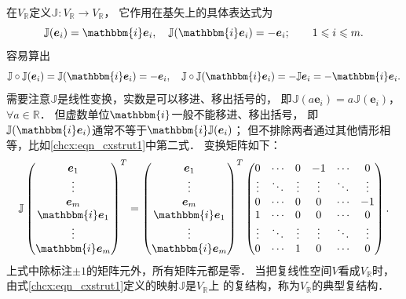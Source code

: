 在$V_{\mathbb{R}}$定义$\mathbb{J}:V_{\mathbb{R}}\to V_{\mathbb{R}}$，
它作用在基矢上的具体表达式为
\begin{equation}\label{chcx:eqn_cxstrut1}
    \mathbb{J} (\boldsymbol{e}_i) = \mathbbm{i} \boldsymbol{e}_i, \quad
    \mathbb{J} (\mathbbm{i}\boldsymbol{e}_i) = - \boldsymbol{e}_i; \qquad 1\leqslant i \leqslant m.
\end{equation}
容易算出
\begin{equation}
    \mathbb{J}\circ \mathbb{J} (\boldsymbol{e}_i) = \mathbb{J} (\mathbbm{i}\boldsymbol{e}_i) = - \boldsymbol{e}_i, \quad
    \mathbb{J}\circ \mathbb{J} (\mathbbm{i}\boldsymbol{e}_i) = - \mathbb{J} \boldsymbol{e}_i = -\mathbbm{i}\boldsymbol{e}_i.
\end{equation}
需要注意$\mathbb{J}$是线性变换，实数是可以移进、移出括号的，
即$\mathbb{J} (a\boldsymbol{e}_i)=a \mathbb{J} (\boldsymbol{e}_i)$，$\forall a\in \mathbb{R}$．
但虚数单位$\mathbbm{i}$一般不能移进、移出括号，
即$\mathbb{J} (\mathbbm{i}\boldsymbol{e}_i)$通常不等于$\mathbbm{i}\mathbb{J} (\boldsymbol{e}_i)$；
但不排除两者通过其他情形相等，比如\eqref{chcx:eqn_cxstrut1}中第二式．
变换矩阵如下：
\begin{equation}\label{chcx:eqn_J-matrix}
    \mathbb{J} \begin{pmatrix}
        \boldsymbol{e}_1 \\  \vdots\\ \boldsymbol{e}_m \\   
        \mathbbm{i}\boldsymbol{e}_1\\  \vdots\\ \mathbbm{i}\boldsymbol{e}_m
    \end{pmatrix}^T
    =\begin{pmatrix}
        \boldsymbol{e}_1 \\  \vdots\\ \boldsymbol{e}_m \\   
        \mathbbm{i}\boldsymbol{e}_1\\  \vdots\\ \mathbbm{i}\boldsymbol{e}_m
    \end{pmatrix}^T
    \begin{pmatrix}
        0&\cdots&0 & -1 &  \cdots & 0\\
        \vdots&\ddots&\vdots &\vdots&\ddots&\vdots\\
        0&\cdots&0 & 0 &  \cdots & -1\\
        1&\cdots&0 &0&\cdots&0 \\
        \vdots&\ddots&\vdots &\vdots&\ddots&\vdots\\
        0&\cdots&1 & 0 & \cdots & 0
    \end{pmatrix} .
\end{equation}
上式中除标注$\pm 1$的矩阵元外，所有矩阵元都是零．
当把复线性空间$V$看成$V_{\mathbb{R}}$时，
由式\eqref{chcx:eqn_cxstrut1}定义的映射$\mathbb{J}$是$V_{\mathbb{R}}$上
的{\kaishu 复结构}，称为$V_{\mathbb{R}}$的{\heiti 典型复结构}．


